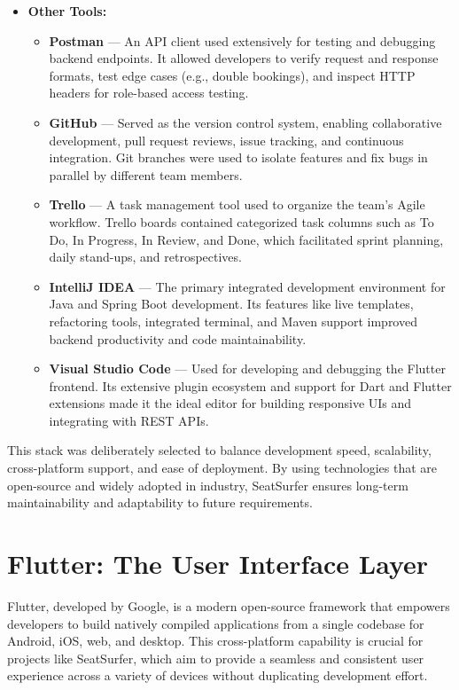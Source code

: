 \documentclass[12pt,a4paper]{report}
\begin{document}
\begin{itemize}
    \item \textbf{Other Tools:}
    \begin{itemize}
        \item \textbf{Postman} — An API client used extensively for testing and debugging backend endpoints. It allowed developers to verify request and response formats, test edge cases (e.g., double bookings), and inspect HTTP headers for role-based access testing.
        
        \item \textbf{GitHub} — Served as the version control system, enabling collaborative development, pull request reviews, issue tracking, and continuous integration. Git branches were used to isolate features and fix bugs in parallel by different team members.
        
        \item \textbf{Trello} — A task management tool used to organize the team's Agile workflow. Trello boards contained categorized task columns such as To Do, In Progress, In Review, and Done, which facilitated sprint planning, daily stand-ups, and retrospectives.
        
        \item \textbf{IntelliJ IDEA} — The primary integrated development environment for Java and Spring Boot development. Its features like live templates, refactoring tools, integrated terminal, and Maven support improved backend productivity and code maintainability.
        
        \item \textbf{Visual Studio Code} — Used for developing and debugging the Flutter frontend. Its extensive plugin ecosystem and support for Dart and Flutter extensions made it the ideal editor for building responsive UIs and integrating with REST APIs.
    \end{itemize}
\end{itemize}

This stack was deliberately selected to balance development speed, scalability, cross-platform support, and ease of deployment. By using technologies that are open-source and widely adopted in industry, SeatSurfer ensures long-term maintainability and adaptability to future requirements.

\section{Flutter: The User Interface Layer}

Flutter, developed by Google, is a modern open-source framework that empowers developers to build natively compiled applications from a single codebase for Android, iOS, web, and desktop. This cross-platform capability is crucial for projects like SeatSurfer, which aim to provide a seamless and consistent user experience across a variety of devices without duplicating development effort.
\end{document}

